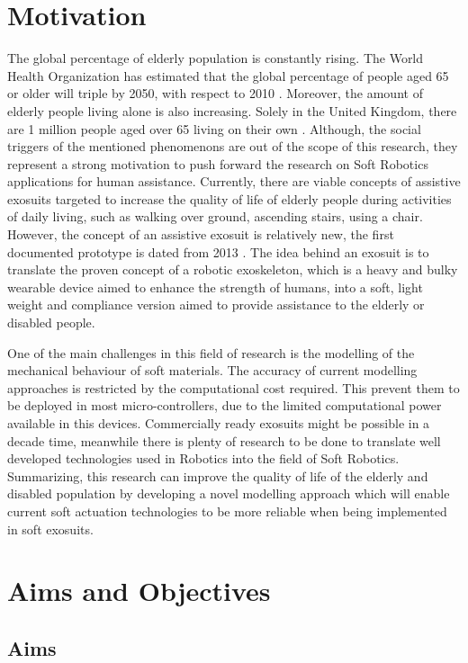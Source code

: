 \section{Motivation}

The global percentage of elderly population is constantly rising. The World Health Organization has estimated that the global percentage of people aged 65 or older will triple by 2050, with respect to 2010 \cite{Colombo2012}. Moreover, the amount of elderly people living alone is also increasing. Solely in the United Kingdom, there are 1 million people aged over 65 living on their own \cite{Hill2019}. Although, the social triggers of the mentioned phenomenons are out of the scope of this research, they represent a strong motivation to push forward the research on Soft Robotics applications for human assistance. Currently, there are viable concepts of assistive exosuits targeted to increase the quality of life of elderly people during activities of daily living, such as walking over ground, ascending stairs, using a chair. However, the concept of an assistive exosuit is relatively new, the first documented prototype is dated from 2013 \cite{wehner2013lightweight}. The idea behind an exosuit is to translate the proven concept of a robotic exoskeleton, which is a heavy and bulky wearable device aimed to enhance the strength of humans, into a soft, light weight and compliance version aimed to provide assistance to the elderly or disabled people. 

One of the main challenges in this field of research is the modelling of the mechanical behaviour of soft materials. The accuracy of current modelling approaches is restricted by the computational cost required. This prevent them to be deployed in most micro-controllers, due to the limited computational power available in this devices. Commercially ready exosuits might be possible in a decade time, meanwhile there is plenty of research to be done to translate well developed technologies used in Robotics into the field of Soft Robotics. Summarizing, this research can improve the quality of life of the elderly and disabled population by developing a novel modelling approach which will enable current soft actuation technologies to be more reliable when being implemented in soft exosuits.

\section{Aims and Objectives}

\subsection{Aims}

